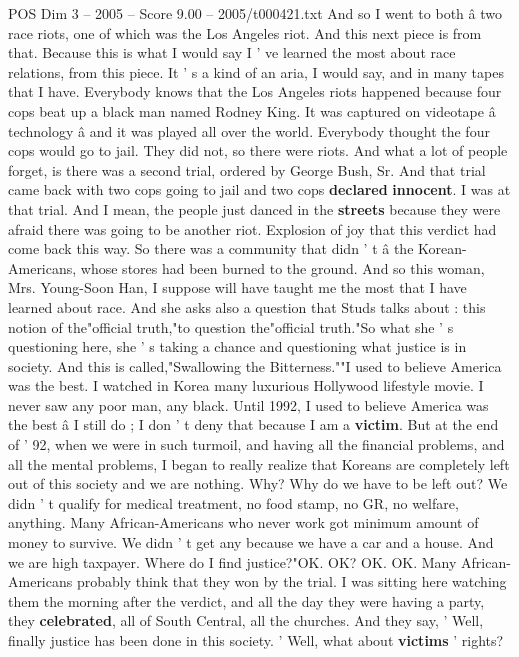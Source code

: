\begin{textsample}{POS Dim 3 – 2005 – Score 9.00 – 2005/t000421.txt}
And so I went to both â two race riots, one of which was the Los Angeles riot.
And this next piece is from that.
Because this is what I would say I ' ve learned the most about race relations, from this piece.
It ' s a kind of an aria, I would say, and in many tapes that I have.
Everybody knows that the Los Angeles riots happened because four cops beat up a black man named Rodney King.
It was captured on videotape â technology â and it was played all over the world.
Everybody thought the four cops would go to jail.
They did not, so there were riots.
And what a lot of people forget, is there was a second trial, ordered by George Bush, Sr.
And that trial came back with two cops going to jail and two cops \textbf{declared} \textbf{innocent}.
I was at that trial.
And I mean, the people just danced in the \textbf{streets} because they were afraid there was going to be another riot.
Explosion of joy that this verdict had come back this way.
So there was a community that didn ' t â the Korean-Americans, whose stores had been burned to the ground.
And so this woman, Mrs.
Young-Soon Han, I suppose will have taught me the most that I have learned about race.
And she asks also a question that Studs talks about : this notion of the"official truth,"to question the"official truth."So what she ' s questioning here, she ' s taking a chance and questioning what justice is in society.
And this is called,"Swallowing the Bitterness.""I used to believe America was the best.
I watched in Korea many luxurious Hollywood lifestyle movie.
I never saw any poor man, any black.
Until 1992, I used to believe America was the best â I still do ; I don ' t deny that because I am a \textbf{victim}.
But at the end of ' 92, when we were in such turmoil, and having all the financial problems, and all the mental problems, I began to really realize that Koreans are completely left out of this society and we are nothing.
Why?
Why do we have to be left out?
We didn ' t qualify for medical treatment, no food stamp, no GR, no welfare, anything.
Many African-Americans who never work got minimum amount of money to survive.
We didn ' t get any because we have a car and a house.
And we are high taxpayer.
Where do I find justice?"OK.
OK?
OK.
OK.
Many African- Americans probably think that they won by the trial.
I was sitting here watching them the morning after the verdict, and all the day they were having a party, they \textbf{celebrated}, all of South Central, all the churches.
And they say, ' Well, finally justice has been done in this society. ' Well, what about \textbf{victims} ' rights?

\end{textsample}
